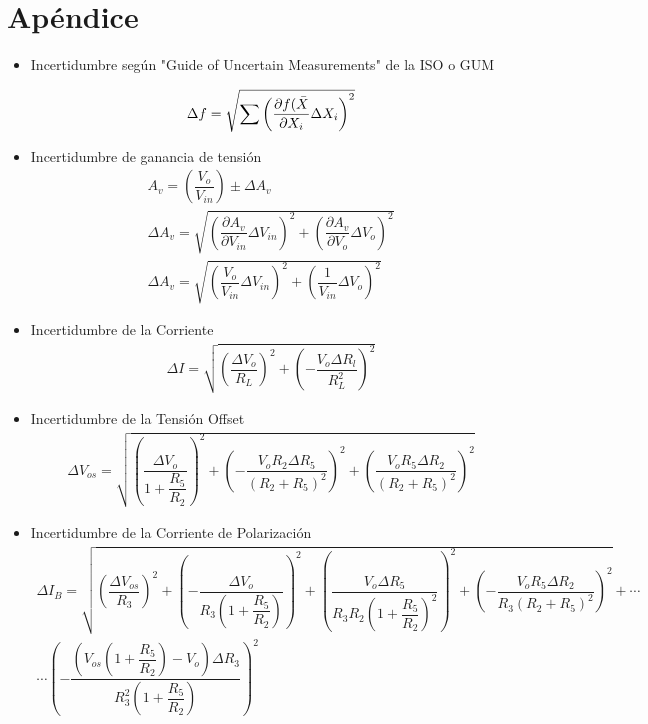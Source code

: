 
\section{Apéndice}\label{sec:apendice}
\begin{itemize}
    \item Incertidumbre según "Guide of Uncertain Measurements" de la ISO o GUM

        \begin{gather}
            \Delta f=\sqrt{\sum\left( \dfrac{\partial f(\Bar{X} }{\partial X_i} \Delta X_i\right)^2}
        \end{gather}

    \item Incertidumbre de ganancia de tensión
    \begin{gather}
        A_v = \left(\dfrac{V_o}{V_{in}}\right) \pm \Delta A_v  \nonumber \\[0.2cm]
        \Delta A_v = \sqrt{\left(\dfrac{\partial A_v }{\partial V_{in}}\Delta V_{in}\right)^2+\left(\dfrac{\partial A_v }{\partial V_o}\Delta V_o\right)^2} \nonumber \\[0.2cm]
        \Delta A_v = \sqrt{\left(\dfrac{V_o}{V_{in}}\Delta V_{in}\right)^2 + \left(\dfrac{1}{V_{in}}\Delta V_o\right)^2}
        \label{eqn:delta_ganancia}
    \end{gather}

    \item Incertidumbre de la Corriente
        \begin{gather}
            \Delta I=\sqrt{\left(\dfrac{\Delta V_o}{R_L}\right)^2+\left(-\dfrac{V_o\Delta R_l}{R_L^2}\right)^2}
             \label{eqn:delta_corriente}
        \end{gather}

    \item Incertidumbre de la Tensión Offset
        \begin{gather}
            \Delta V_{os}=\sqrt{\left(\dfrac{\Delta V_o}{1+\dfrac{R_5}{R_2}}\right)^2+\left(-\dfrac{V_oR_2\Delta R_5}{(R_2+R_5)^2}\right)^2+\left(\dfrac{V_oR_5 \Delta R_2}{(R_2+R_5)^2}\right)^2}
             \label{eqn:delta_tension_offset}
        \end{gather}

    \item Incertidumbre de la Corriente de Polarización
        \begin{gather}
            \Delta I_B=\sqrt{\left(\dfrac{\Delta V_{os}}{R_3}\right)^2+\left(-\dfrac{\Delta V_o}{R_3\left(1+\dfrac{R_5}{R_2}\right)}\right)^2+\left(\dfrac{V_o \Delta R_5}{R_3R_2\left(1+\dfrac{R_5}{R_2}\right)^2}\right)^2+\left(-\dfrac{V_oR_5 \Delta R_2}{R_3(R_2+R_5)^2}\right)^2} +\nonumber\cdots\\[0.5cm] 
            \cdots \left(-\dfrac{\left(V_{os}\left(1+\dfrac{R_5}{R_2}\right) -V_o\right)\Delta R_3}{R_3^2\left(1+\dfrac{R_5}{R_2}\right)}\right)^2
             \label{eqn:delta_corriente_polarizacion}
        \end{gather}


\end{itemize}
